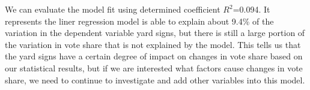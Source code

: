 \documentclass[12pt,letterpaper]{article}
\begin{document}
\begin{enumerate}
	\noindent  We can evaluate the model fit using determined coefficient $R^2$=0.094. It represents the liner regression model is able to explain about 9.4\% of the variation in the dependent variable yard signs, but there is still a large portion of the variation in vote share that is not explained by the model. This tells us that the yard signs  have a certain degree of impact on changes in vote share based on our statistical results, but if we are interested what factors cause changes in vote share, we need to continue to investigate and add other variables into this model.
	
\end{enumerate}  
\end{document}
